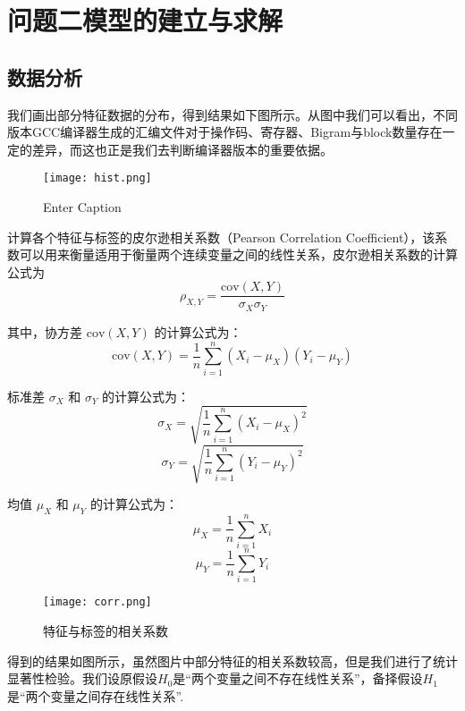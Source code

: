 \section{问题二模型的建立与求解}
  \subsection{数据分析}
  我们画出部分特征数据的分布，得到结果如下图所示。从图中我们可以看出，不同版本GCC编译器生成的汇编文件对于操作码、寄存器、Bigram与block数量存在一定的差异，而这也正是我们去判断编译器版本的重要依据。
  \begin{figure}[H]
      \centering
      \texttt{[image: hist.png]}
      \caption{Enter Caption}
      \label{fig:enter-label}
  \end{figure}

  
计算各个特征与标签的皮尔逊相关系数（Pearson Correlation Coefficient），该系数可以用来衡量适用于衡量两个连续变量之间的线性关系，皮尔逊相关系数的计算公式为
\begin{equation}
\rho_{X,Y} = \frac{\text{cov}(X, Y)}{\sigma_X \sigma_Y}
\label{eq:correlation}
\end{equation}

其中，协方差 \(\text{cov}(X, Y)\) 的计算公式为：
\begin{equation}
\text{cov}(X, Y) = \frac{1}{n} \sum_{i=1}^{n} (X_i - \mu_X)(Y_i - \mu_Y)
\label{eq:covariance}
\end{equation}

标准差 \(\sigma_X\) 和 \(\sigma_Y\) 的计算公式为：
\begin{equation}
\sigma_X = \sqrt{\frac{1}{n} \sum_{i=1}^{n} (X_i - \mu_X)^2}
\label{eq:stddev_x}
\end{equation}
\begin{equation}
\sigma_Y = \sqrt{\frac{1}{n} \sum_{i=1}^{n} (Y_i - \mu_Y)^2}
\label{eq:stddev_y}
\end{equation}

均值 \(\mu_X\) 和 \(\mu_Y\) 的计算公式为：
\begin{equation}
\mu_X = \frac{1}{n} \sum_{i=1}^{n} X_i
\label{eq:mean_x}
\end{equation}
\begin{equation}
\mu_Y = \frac{1}{n} \sum_{i=1}^{n} Y_i
\label{eq:mean_y}
\end{equation}

  \begin{figure}[H]
      \centering
      \texttt{[image: corr.png]}
      \caption{特征与标签的相关系数}
      \label{fig:enter-label}
  \end{figure}
得到的结果如图所示，虽然图片中部分特征的相关系数较高，但是我们进行了统计显著性检验。我们设原假设$H_0$是“两个变量之间不存在线性关系”，备择假设$H_1$是“两个变量之间存在线性关系”.

